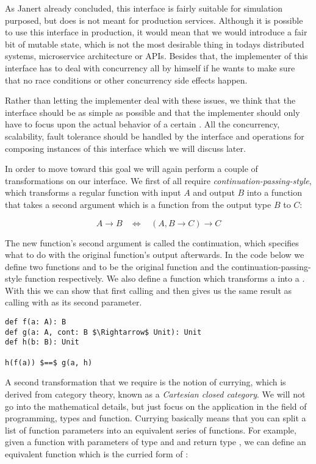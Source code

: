 As Janert already concluded, this interface is fairly suitable for simulation purposed, but does is not meant for production services. Although it is possible to use this interface in production, it would mean that we would introduce a fair bit of mutable state, which is not the most desirable thing in todays distributed systems, microservice architecture or APIs. Besides that, the implementer of this \comp interface has to deal with concurrency all by himself if he wants to make sure that no race conditions or other concurrency side effects happen.

Rather than letting the implementer deal with these issues, we think that the interface should be as simple as possible and that the implementer should only have to focus upon the actual behavior of a certain \comp. All the concurrency, scalability, fault tolerance should be handled by the interface and operations for composing instances of this interface which we will discuss later.

In order to move toward this goal we will again perform a couple of transformations on our \comp interface. We first of all require \textit{continuation-passing-style}, which transforms a regular function with input $A$ and output $B$ into a function that takes a second argument which is a function from the output type $B$ to $C$:

\[A \rightarrow B \ \ \ \ \Leftrightarrow \ \ \ \ (A, B \rightarrow C) \rightarrow C\]

The new function's second argument is called the continuation, which specifies what to do with the original function's output afterwards. In the code below we define two functions  and  to be the original function and the continuation-passing-style function respectively. We also define a function  which transforms a  into a . With this we can show that first calling  and then  gives us the same result as calling  with  as its second parameter.

\begin{lstlisting}[style=InlineScalaStyle]
def f(a: A): B
def g(a: A, cont: B $\Rightarrow$ Unit): Unit
def h(b: B): Unit

h(f(a)) $==$ g(a, h)
\end{lstlisting}

A second transformation that we require is the notion of currying, which is derived from category theory, known as a \textit{Cartesian closed category}. We will not go into the mathematical details, but just focus on the application in the field of programming, types and function. Currying basically means that you can split a list of function parameters into an equivalent series of functions. For example, given a function  with parameters of type  and  and return type , we can define an equivalent function  which is the curried form of :

